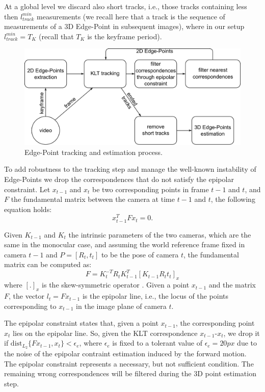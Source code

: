 At a global level we discard also short tracks, i.e., those tracks containing less then $l_{track}^{min}$ measurements (we recall here that a track is the sequence of measurements of a 3D Edge-Point in subsequent images), where in our setup $l_{track}^{min} = T_K$ (recall that $T_K$ is the keyframe period). 


\begin{figure}[t]
\centering
\includegraphics[width=0.8\columnwidth]{./img//EdgePoint}
\caption{Edge-Point tracking and estimation process.}
\label{fig:algorithm}
\end{figure}

To add robustness to the tracking step and manage the well-known instability  of Edge-Points  we drop the correspondences that do not satisfy the epipolar constraint. 
Let $x_{t-1}$ and $x_t$ be two corresponding points in frame $t-1$ and $t$, and $F$ the fundamental matrix between the camera at time $t-1$ and $t$, the following equation holds:
\[
 x_{t-1}^{T}Fx_t = 0 .
\]

Given $K_{t-1}$ and $K_t$ the intrinsic parameters of the two cameras, which are the same in the monocular case, and assuming the world reference frame fixed in camera $t-1$ and $P = [R_t,t_t]$ to be the pose of camera $t$, the fundamental matrix can be computed as:
\[
F = K_t^{-T}R_tK_{t-1}^T [K_{t-1}R_{t}t_t]_x
\]
where $[.]_x$ is the skew-symmetric operator \cite{HaZi04}.
Given a point $x_{t-1}$ and the matrix $F$, the vector $l_{t} = Fx_{t-1}$ is the epipolar line, i.e., the locus of the points corresponding to $x_{t-1}$ in the image plane of camera $t$. 

The epipolar constraint states that, given a point $x_{t-1}$, the corresponding point $x_{t}$ lies on the epipolar line. So, given the KLT correspondence $x_{t-1}$-${x}_{t}$, we drop it if $\text{dist}_{L_2}\{Fx_{t-1}, {x}_{t}\} <\epsilon_e$, where $\epsilon_e$ is fixed to a tolerant value of $\epsilon_e = 20px$ due to the noise of the epipolar contraint estimation induced by the forward motion.
The epipolar constraint represents a necessary, but not sufficient condition. The remaining wrong correspondences will be filtered during the 3D point estimation step.

